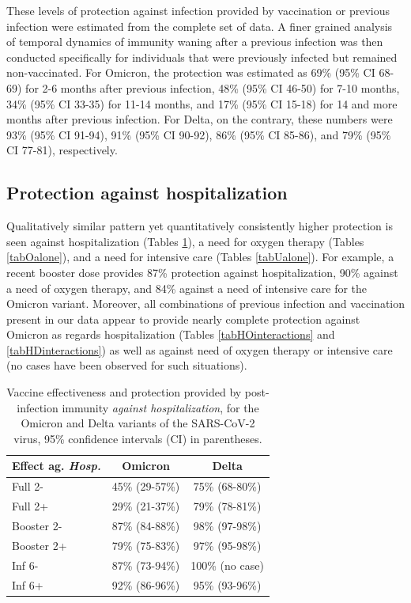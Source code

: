 \documentclass[9pt,twocolumn,twoside,lineno]{pnas-new}
\def\nocase{no case}
\begin{document}
These levels of protection against infection provided by vaccination or previous infection were estimated from the complete set of data. A finer grained analysis of temporal dynamics of immunity waning after a previous infection was then conducted specifically for individuals that were previously infected but remained non-vaccinated. For Omicron, the protection was estimated as 69\% (95\% CI 68-69) for 2-6 months after previous infection,  48\% (95\% CI 46-50) for 7-10 months, 34\% (95\% CI 33-35) for 11-14 months, and 17\% (95\% CI 15-18) for 14 and more months after previous infection. For Delta, on the contrary, these numbers were 93\% (95\% CI 91-94), 91\% (95\% CI 90-92), 86\% (95\% CI 85-86), and 79\% (95\% CI 77-81), respectively.

\subsection*{Protection against hospitalization}

Qualitatively similar pattern yet quantitatively consistently higher protection is seen against hospitalization (Tables \ref{tabHalone}), a need for oxygen therapy (Tables \ref{tabOalone}), and a need for intensive care (Tables \ref{tabUalone}). 
For example, a recent booster dose provides 87\% protection against hospitalization, 90\% against a need of oxygen therapy, and 84\% against a need of intensive care for the Omicron variant. Moreover, all combinations of previous infection and vaccination present in our data appear to provide nearly complete protection against Omicron as regards hospitalization (Tables \ref{tabHOinteractions} and \ref{tabHDinteractions}) as well as against need of oxygen therapy or intensive care (no cases have been observed for such situations).

\begin{table}[!ht]
\caption{Vaccine effectiveness and protection provided by post-infection immunity {\it against hospitalization}, for the Omicron and Delta variants of the SARS-CoV-2 virus, 95\% confidence intervals (CI) in parentheses.}
\label{tabHalone}
\centering
\begin{tabular}{|l|c|c|}
\hline
\cellcolor{gray!20}Effect ag. {\it Hosp.} & \cellcolor{gray!20} Omicron & \cellcolor{gray!20} Delta \\
\hline
Full 2-&45\% (29-57\%)&75\% (68-80\%)\\
\cellcolor{gray!10}Full 2+&\cellcolor{gray!10}29\% (21-37\%) &\cellcolor{gray!10}79\% (78-81\%)\\
Booster 2-&87\% (84-88\%)&98\% (97-98\%)\\
\cellcolor{gray!10}Booster 2+&\cellcolor{gray!10}79\% (75-83\%)&\cellcolor{gray!10}97\% (95-98\%)\\
Inf 6-& 
87\% (73-94\%)
&100\% (\nocase)\\
\cellcolor{gray!10}Inf 6+&\cellcolor{gray!10}
92\% (86-96\%) 
&\cellcolor{gray!10}95\% (93-96\%)\\
\hline
\end{tabular}
\end{table}
\end{document}

